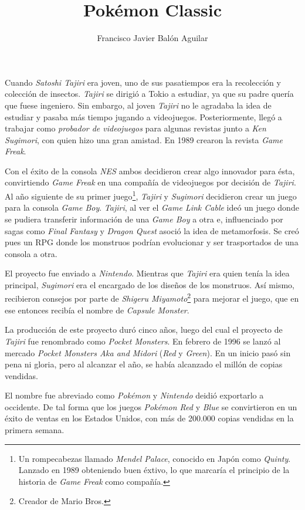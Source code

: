 \documentclass[11pt, oneside, titlepage]{article}
\title{\textbf{Pokémon Classic}}
\author{Francisco Javier Balón Aguilar}
\begin{document}
\maketitle

Cuando \textit{Satoshi Tajiri} era joven, uno de sus pasatiempos era la recolección y 
colección de insectos. \textit{Tajiri} se dirigió a Tokio a estudiar, ya que su 
padre quería que fuese ingeniero. Sin embargo, al joven \textit{Tajiri} no le agradaba la 
idea de estudiar y pasaba más tiempo jugando a videojuegos. Posteriormente, llegó a trabajar 
como \textit{probador de videojuegos} para algunas revistas junto a \textit{Ken Sugimori}, 
con quien hizo una gran amistad. En 1989 crearon la revista \textit{Game Freak}.

Con el éxito de la consola \textit{NES} ambos decidieron crear algo innovador para ésta, 
convirtiendo \textit{Game Freak} en una compañía de videojuegos por decisión de \textit{Tajiri}.
Al año siguiente de su primer juego\footnote{
    Un rompecabezas llamado \textit{Mendel Palace}, conocido en Japón como \textit{Quinty}. 
    Lanzado en 1989 obteniendo buen éxtivo, lo que marcaría el principio de la historia de 
    \textit{Game Freak} como compañía.
}, \textit{Tajiri} y \textit{Sugimori} decidieron crear un juego para la consola \textit{Game Boy}.
\textit{Tajiri}, al ver el \textit{Game Link Cable} ideó un juego donde se pudiera transferir 
información de una \textit{Game Boy} a otra e, influenciado por sagas como \textit{Final Fantasy}
y \textit{Dragon Quest} asoció la idea de metamorfosis. Se creó pues un RPG donde los 
monstruos podrían evolucionar y ser trasportados de una consola a otra.

El proyecto fue enviado a \textit{Nintendo}. Mientras que \textit{Tajiri} era quien tenía 
la idea principal, \textit{Sugimori} era el encargado de los diseños de los monstruos. Así mismo, 
recibieron consejos por parte de \textit{Shigeru Miyamoto}\footnote{
    Creador de Mario Bros.
} para mejorar el juego, que en ese entonces recibía el nombre de \textit{Capsule Monster}.

La producción de este proyecto duró cinco años, luego del cual el proyecto de \textit{Tajiri} 
fue renombrado como \textit{Pocket Monsters}. En febrero de 1996 se lanzó al mercado 
\textit{Pocket Monsters Aka and Midori} (\textit{Red} y \textit{Green}). En un inicio pasó sin 
pena ni gloria, pero al alcanzar el año, se había alcanzado el millón de copias vendidas.


El nombre fue abreviado como \textit{Pokémon} y \textit{Nintendo} deidió exportarlo a occidente. 
De tal forma que los juegos \textit{Pokémon Red} y \textit{Blue} se convirtieron en un éxito de 
ventas en los Estados Unidos, con más de 200.000 copias vendidas en la primera semana.
\end{document}
